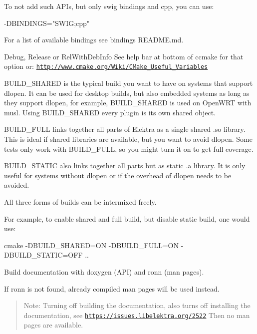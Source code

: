 To not add such A\+P\+Is, but only {\ttfamily swig} bindings and {\ttfamily cpp}, you can use\+:


\begin{DoxyCode}
-DBINDINGS="SWIG;cpp"
\end{DoxyCode}


For a list of available bindings see binding\textquotesingle{}s R\+E\+A\+D\+ME.md.

{\ttfamily Debug}, {\ttfamily Release} or {\ttfamily Rel\+With\+Deb\+Info} See help bar at bottom of {\ttfamily ccmake} for that option or\+: \href{http://www.cmake.org/Wiki/CMake_Useful_Variables}{\tt http\+://www.\+cmake.\+org/\+Wiki/\+C\+Make\+\_\+\+Useful\+\_\+\+Variables}

{\ttfamily B\+U\+I\+L\+D\+\_\+\+S\+H\+A\+R\+ED} is the typical build you want to have on systems that support {\ttfamily dlopen}. It can be used for desktop builds, but also embedded systems as long as they support {\ttfamily dlopen}, for example, {\ttfamily B\+U\+I\+L\+D\+\_\+\+S\+H\+A\+R\+ED} is used on Open\+W\+RT with {\ttfamily musl}. Using {\ttfamily B\+U\+I\+L\+D\+\_\+\+S\+H\+A\+R\+ED} every plugin is its own shared object.

{\ttfamily B\+U\+I\+L\+D\+\_\+\+F\+U\+LL} links together all parts of Elektra as a single shared {\ttfamily .so} library. This is ideal if shared libraries are available, but you want to avoid {\ttfamily dlopen}. Some tests only work with {\ttfamily B\+U\+I\+L\+D\+\_\+\+F\+U\+LL}, so you might turn it on to get full coverage.

{\ttfamily B\+U\+I\+L\+D\+\_\+\+S\+T\+A\+T\+IC} also links together all parts but as static {\ttfamily .a} library. It is only useful for systems without {\ttfamily dlopen} or if the overhead of {\ttfamily dlopen} needs to be avoided.

All three forms of builds can be intermixed freely.

For example, to enable shared and full build, but disable static build, one would use\+:


\begin{DoxyCode}
cmake -DBUILD\_SHARED=ON -DBUILD\_FULL=ON -DBUILD\_STATIC=OFF ..
\end{DoxyCode}


Build documentation with doxygen (A\+PI) and ronn (man pages).

If ronn is not found, already compiled man pages will be used instead.

\begin{quote}
Note\+: Turning off building the documentation, also turns off installing the documentation, see \href{https://issues.libelektra.org/2522}{\tt https\+://issues.\+libelektra.\+org/2522} Then no man pages are available. \end{quote}


